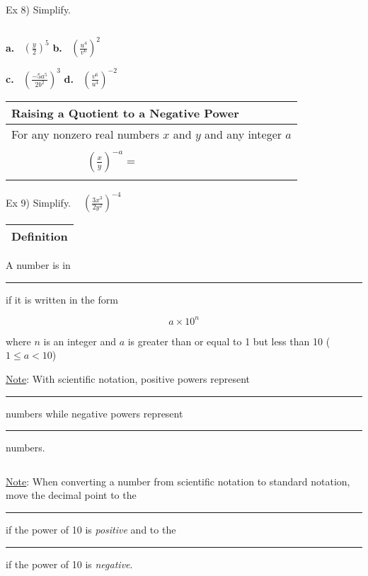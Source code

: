 \documentclass{ximera}
\begin{document}
\noindent Ex 8) Simplify.

$~$

\textbf{a.}$~~~~$$\displaystyle \left(\frac{y}{2}\right)^5 $\hspace{2in} \textbf{b.}$~~~~$$\displaystyle \left(\frac{u^4}{v^6}\right)^2$

\vspace{1in}

\hspace{1in}\textbf{c.}$~~~~$$\displaystyle \left(\frac{-5a^5}{2b^2}\right)^3  $\hspace{2in} \textbf{d.}$~~~~$$\displaystyle \left(\frac{v^6}{u^4}\right)^{-2}$

\vspace{1in}

\begin{center} \begin{tabular}{|l|}
\hline 
Raising a Quotient to a Negative Power\\
\hline
For any nonzero real numbers $x$ and $y$ and any integer $a$\\
$~$\\
$~~~~~~~~~~~~~~~~~~~~~~~~~~~~~~${\Large$\displaystyle \left(\frac{x}{y}\right)^{-a}=~~~~$}\\
$~$\\
\hline
\end{tabular} \end{center}


\noindent Ex 9) Simplify. $~~~~$$\displaystyle \left( \frac{3x^3}{2y^2}\right)^{-4}$

\pagebreak


\noindent \begin{tabular}{|l|}
\hline 
Definition\\
\hline \end{tabular} A number is in \rule{3in}{.5pt} if it is written in the form

{\Large $$a \times 10^n$$}

where $n$ is an integer and $a$ is greater than or equal to 1 but less than 10 ($1\leq a < 10$)

\vspace{.2in}

\noindent \underline{Note}: With scientific notation, positive powers represent \rule{1in}{.5pt} numbers while negative powers represent \rule{1in}{.5pt} numbers.

$~$

\noindent \underline{Note}: When converting a number from scientific notation to standard notation, move the decimal point to the \rule{1in}{.5pt} if the power of 10 is \textit{positive} and to the \rule{1in}{.5pt} if the power of 10 is \textit{negative}.
\end{document}
